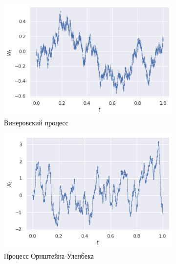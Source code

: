     \begin{figure}[tbp]
        \centering
        \begin{subfigure}[b]{0.48\textwidth}
            \centering
            \includegraphics[width=\textwidth]{resources/task9_Wiener.png}
            \caption{Винеровский процесс}
        \end{subfigure}
        \hfill
        \begin{subfigure}[b]{0.48\textwidth}
            \centering
            \includegraphics[width=\textwidth]{resources/task9_OrnUhl.png}
            \caption{Процесс Орнштейна-Уленбека}
        \end{subfigure}
        \caption{}
        \label{processes}
    \end{figure}